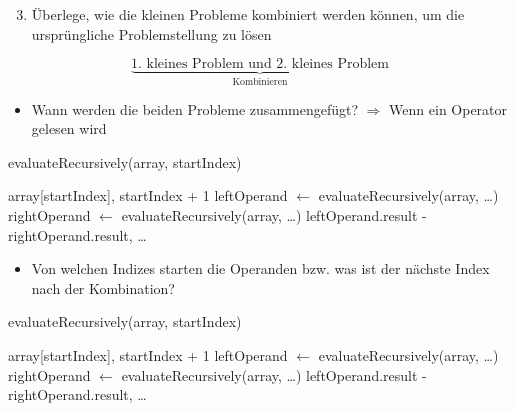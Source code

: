 \documentclass{../tuda-beamer}
\begin{document}
    \begin{frame}[c]
        
    \end{frame}

    \begin{frame}
        \begin{enumerate}
            \setcounter{enumi}{2}
            \item Überlege, wie die kleinen Probleme kombiniert werden können, um die
            ursprüngliche Problemstellung zu lösen
        \end{enumerate}

        \begin{equation*}
            \underbrace{\text{1. kleines Problem und 2. kleines Problem}}_{\text{Kombinieren}}
        \end{equation*}

        \begin{itemize}
            \item Wann werden die beiden Probleme zusammengefügt? \pause \(\Rightarrow\) Wenn ein
            Operator gelesen wird
        \end{itemize}

        \begin{algorithm}[H]
            \caption{evaluateRecursively(array, startIndex)}
            \begin{algorithmic}[1]
                    \State \Return array[startIndex], startIndex + 1
                \Else
                    \State leftOperand \(\leftarrow\) evaluateRecursively(array, \dots)
                    \State rightOperand \(\leftarrow\) evaluateRecursively(array, \dots)
                    \State \Return leftOperand.result - rightOperand.result, \dots
                \EndIf
            \end{algorithmic}
        \end{algorithm}
    \end{frame}

    \begin{frame}
        \begin{itemize}
            \item Von welchen Indizes starten die Operanden bzw. was ist der nächste Index nach
            der Kombination?
        \end{itemize}

        \begin{algorithm}[H]
            \caption{evaluateRecursively(array, startIndex)}
            \begin{algorithmic}[1]
                    \State \Return array[startIndex], startIndex + 1
                \Else
                    \State leftOperand \(\leftarrow\) evaluateRecursively(array, \dots)
                    \State rightOperand \(\leftarrow\) evaluateRecursively(array, \dots)
                    \State \Return leftOperand.result - rightOperand.result, \dots
                \EndIf
            \end{algorithmic}
        \end{algorithm}
    \end{frame}
\end{document}
